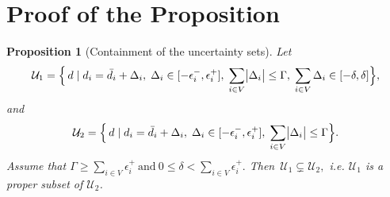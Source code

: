 \documentclass[preprint,12pt,authoryear]{elsarticle}
\newtheorem{proposition}{Proposition}
\begin{document}




\appendix


\section{Proof of the Proposition}\label{ap1}

\begin{proposition}[Containment of the uncertainty sets]\label{prop:U1_subset_U2}
Let
\[
\mathcal{U}_1
=\Bigl\{\,d\mid d_i=\bar d_i+\Delta_i,\;
\Delta_i\in[-\epsilon_i^-,\epsilon_i^+],\;
\sum_{i\in V}\bigl|\Delta_i\bigr|\le\Gamma,\;
\sum_{i\in V}\Delta_i\in[-\delta,\delta]\Bigr\},
\]
and
\[
\mathcal{U}_2
=\Bigl\{\,d\mid d_i=\bar d_i+\Delta_i,\;
\Delta_i\in[-\epsilon_i^-,\epsilon_i^+],\;
\sum_{i\in V}\bigl|\Delta_i\bigr|\le\Gamma\Bigr\}.
\]
Assume that \(\Gamma \ge \sum_{i\in V}\epsilon_i^+~\text{and}~0\le\delta<\sum_{i\in V}\epsilon_i^+.\)
Then~\(\mathcal{U}_1\subsetneq\mathcal{U}_2,\)
i.e. $\mathcal{U}_1$ is a proper subset of $\mathcal{U}_2$.
\end{proposition}
\end{document}
